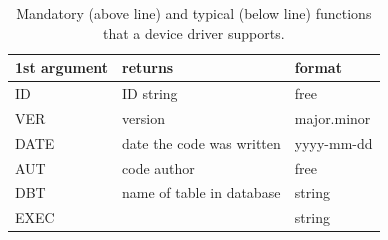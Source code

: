 \documentclass[10pt]{revtex4}
\begin{document}
\begin{table}[htb]
\begin{tabular}{|lll|}
\hline
1st argument & returns & format \\
\hline
\hline
ID & ID string & free\\
VER & version & major.minor\\
DATE & date the code was written & yyyy-mm-dd\\
AUT & code author & free\\
DBT & name of table in database & string\\
\hline
\hline
EXEC & & string\\
\hline
\end{tabular}
\caption{\label{s_drv:t_minf}Mandatory (above line) and typical (below
line) functions that a device driver supports.}
\end{table}

\end{document}
